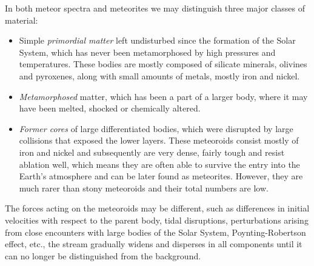             In both meteor spectra and meteorites we may distinguish three major classes of material:
            \begin{itemize}
                \item Simple \emph{primordial matter} left undisturbed since the formation of the Solar System,
                    which has never been metamorphosed by high pressures and temperatures.
                    These bodies are mostly composed of silicate minerals, olivines and pyroxenes,
                    along with small amounts of metals, mostly iron and nickel.
                \item \emph{Metamorphosed} matter, which has been a part of a larger body,
                    where it may have been melted, shocked or chemically altered.
                \item \emph{Former cores} of large differentiated bodies, which were disrupted by large collisions
                    that exposed the lower layers.
                    These meteoroids consist mostly of iron and nickel and subsequently are very dense,
                    fairly tough and resist ablation well, which means they are often able to
                    survive the entry into the Earth's atmosphere and can be later found as meteorites.
                    However, they are much rarer than stony meteoroids and their total numbers are low.
            \end{itemize}

            The forces acting on the meteoroids may be different, such as differences
            in initial velocities with respect to the parent body, tidal disruptions,
            perturbations arising from close encounters with large bodies of the Solar System,
            Poynting-Robertson effect, etc., the stream
            gradually widens and disperses in all components until it can no longer be distinguished from the background.


